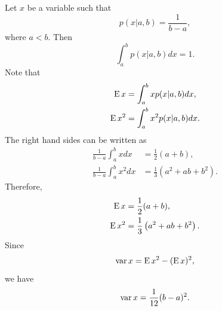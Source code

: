 \subsection{}
\label{2.12}
Let $x$ be a variable such that
%
\begin{equation}
p(x | a,  b) 
= 
\frac{1}{b - a},
\end{equation}
%
where $a < b$.
Then
%
\begin{equation}
\int_{a}^{b} 
p(x | a, b) 
dx 
= 
1.
\end{equation}
%
Note that
%
\begin{equation}
\begin{aligned}
\operatorname{E} x 
&= 
\int_{a}^{b} 
x 
p(x | a, b) 
dx, 
\\
\operatorname{E} x ^ 2 
&= 
\int_{a}^{b} 
x ^ 2 
p(x | a, b) 
dx.
\end{aligned}
\end{equation}
%
The right hand sides can be written as
%
\begin{equation}
\begin{aligned}
\frac{1}{b - a} 
\int_{a}^{b} 
x 
dx 
&= 
\frac{1}{2} 
(a + b), 
\\
\frac{1}{b - a} 
\int_{a}^{b} 
x ^ 2 
dx 
&= 
\frac{1}{3} 
\left( 
	a ^ 2 
	+ 
	a b 
	+ 
	b ^ 2 
\right).
\end{aligned}
\end{equation}
%
Therefore,
%
\begin{equation}
\begin{aligned}
\operatorname{E} x 
&= 
\frac{1}{2} 
(a + b), 
\\
\operatorname{E} x ^ 2 
&= 
\frac{1}{3} 
\left( 
	a ^ 2 
	+ 
	a b 
	+ 
	b ^ 2 
\right).
\end{aligned}
\end{equation}
%
Since 
%
\begin{equation}
\operatorname{var} x 
= 
\operatorname{E} x ^ 2 
- 
( \operatorname{E} x ) ^ 2,
\end{equation}
%
we have
%
\begin{equation}
\operatorname{var} x 
= 
\frac{1}{12} 
(b - a) ^ 2.
\end{equation}
%


